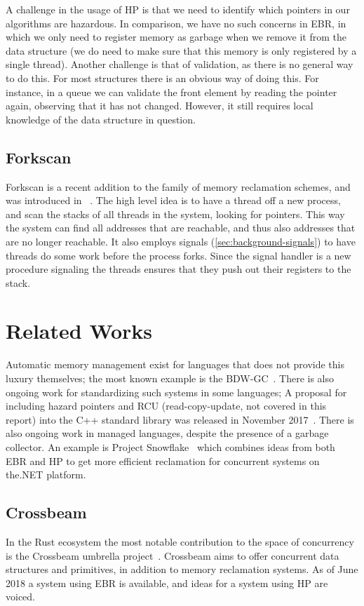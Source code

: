 A challenge in the usage of HP is that we need to identify which pointers in our algorithms are
hazardous. In comparison, we have no such concerns in EBR, in which we only need to register memory
as garbage when we remove it from the data structure (we do need to make sure that this memory is
only registered by a single thread). Another challenge is that of validation, as there is no
general way to do this. For most structures there is an obvious way of doing this. For instance, in
a queue we can validate the front element by reading the  pointer again, observing that
it has not changed. However, it still requires local knowledge of the data structure in question.


\subsection{Forkscan\label{sec:forkscan}}

Forkscan is a recent addition to the family of memory reclamation schemes, and was introduced in
~\cite{alistarh2017forkscan}. The high level idea is to have a thread  off a new
process, and scan the stacks of all threads in the system, looking for pointers. This way the
system can find all addresses that are reachable, and thus also addresses that are no longer
reachable. It also employs signals (\cref{sec:background-signals}) to have threads do some work
before the process forks. Since the signal handler is a new procedure signaling the threads ensures
that they push out their registers to the stack.


\section{Related Works\label{sec:background-related}}

Automatic memory management exist for languages that does not provide this luxury themselves; the
most known example is the BDW-GC~\cite{bdwgc}.  There is also ongoing work for standardizing such
systems in some languages; A proposal for including hazard pointers and RCU (read-copy-update, not
covered in this report) into the C++ standard library was released in November 2017~\cite{cpp:mr}.
There is also ongoing work in managed languages, despite the presence of a garbage collector. An
example is Project
Snowflake~\cite{project-snowflake-non-blocking-safe-manual-memory-management-net} which combines
ideas from both EBR and HP to get more efficient reclamation for concurrent systems on the\@.NET
platform.


\subsection{Crossbeam}

In the Rust ecosystem the most notable contribution to the space of concurrency is the Crossbeam
umbrella project~\cite{crossbeam}. Crossbeam aims to offer concurrent data structures and
primitives, in addition to memory reclamation systems. As of June 2018 a system using EBR is
available, and ideas for a system using HP are voiced.
